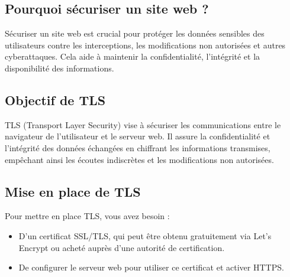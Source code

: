 \subsection{Pourquoi sécuriser un site web ?}

Sécuriser un site web est crucial pour protéger les données sensibles des utilisateurs contre les interceptions, les modifications non autorisées et autres cyberattaques. Cela aide à maintenir la confidentialité, l'intégrité et la disponibilité des informations.

\subsection{Objectif de TLS}

TLS (Transport Layer Security) vise à sécuriser les communications entre le navigateur de l'utilisateur et le serveur web. Il assure la confidentialité et l'intégrité des données échangées en chiffrant les informations transmises, empêchant ainsi les écoutes indiscrètes et les modifications non autorisées.

\subsection{Mise en place de TLS}

Pour mettre en place TLS, vous avez besoin :

\begin{itemize}
	\item D'un certificat SSL/TLS, qui peut être obtenu gratuitement via Let's Encrypt ou acheté auprès d'une autorité de certification.
	\item De configurer le serveur web pour utiliser ce certificat et activer HTTPS.
\end{itemize}

